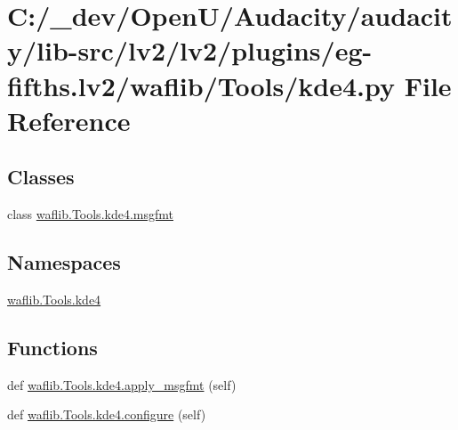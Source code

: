 \hypertarget{lv2_2plugins_2eg-fifths_8lv2_2waflib_2_tools_2kde4_8py}{}\section{C\+:/\+\_\+dev/\+Open\+U/\+Audacity/audacity/lib-\/src/lv2/lv2/plugins/eg-\/fifths.lv2/waflib/\+Tools/kde4.py File Reference}
\label{lv2_2plugins_2eg-fifths_8lv2_2waflib_2_tools_2kde4_8py}
\subsection*{Classes}
\begin{DoxyCompactItemize}
\item 
class \hyperlink{classwaflib_1_1_tools_1_1kde4_1_1msgfmt}{waflib.\+Tools.\+kde4.\+msgfmt}
\end{DoxyCompactItemize}
\subsection*{Namespaces}
\begin{DoxyCompactItemize}
\item 
 \hyperlink{namespacewaflib_1_1_tools_1_1kde4}{waflib.\+Tools.\+kde4}
\end{DoxyCompactItemize}
\subsection*{Functions}
\begin{DoxyCompactItemize}
\item 
def \hyperlink{namespacewaflib_1_1_tools_1_1kde4_a62b36b23c1da96a111189ea65c2c6baa}{waflib.\+Tools.\+kde4.\+apply\+\_\+msgfmt} (self)
\item 
def \hyperlink{namespacewaflib_1_1_tools_1_1kde4_a6ffba63774560559cef87345d1613418}{waflib.\+Tools.\+kde4.\+configure} (self)
\end{DoxyCompactItemize}
